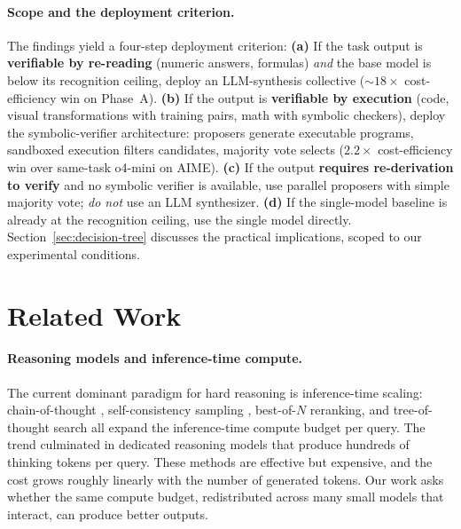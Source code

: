 \documentclass[11pt]{amsart}
\newcommand\1{{\mathds{1}}}
\theoremstyle{definition}
\theoremstyle{remark}
\numberwithin{equation}{section}
\begin{document}
\paragraph{Scope and the deployment criterion.}
The findings yield a four-step deployment criterion:
\textbf{(a)} If the task output is \textbf{verifiable by re-reading} (numeric answers, formulas) \emph{and} the base model is below its recognition ceiling, deploy an LLM-synthesis collective (${\sim}18\times$ cost-efficiency win on Phase~A).
\textbf{(b)} If the output is \textbf{verifiable by execution} (code, visual transformations with training pairs, math with symbolic checkers), deploy the symbolic-verifier architecture: proposers generate executable programs, sandboxed execution filters candidates, majority vote selects ($2.2\times$ cost-efficiency win over same-task o4-mini on AIME).
\textbf{(c)} If the output \textbf{requires re-derivation to verify} and no symbolic verifier is available, use parallel proposers with simple majority vote; \emph{do not} use an LLM synthesizer.
\textbf{(d)} If the single-model baseline is already at the recognition ceiling, use the single model directly.
Section~\ref{sec:decision-tree} discusses the practical implications, scoped to our experimental conditions.

\section{Related Work}\label{sec:related}

\paragraph{Reasoning models and inference-time compute.}
The current dominant paradigm for hard reasoning is inference-time scaling: chain-of-thought \cite{Wei2022CoT}, self-consistency sampling \cite{Wang2023SelfConsistency}, best-of-$N$ reranking, and tree-of-thought search \cite{Yao2023ToT} all expand the inference-time compute budget per query.
The trend culminated in dedicated reasoning models that produce hundreds of thinking tokens per query.
These methods are effective but expensive, and the cost grows roughly linearly with the number of generated tokens.
Our work asks whether the same compute budget, redistributed across many small models that interact, can produce better outputs.
\end{document}
